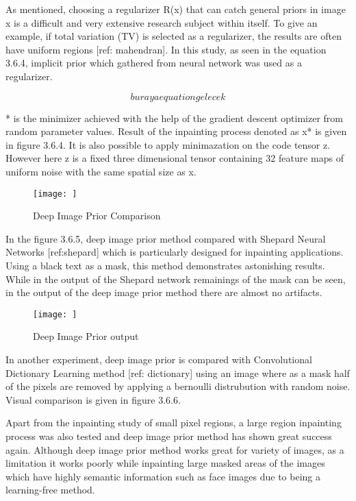 As mentioned, choosing a regularizer R(x) that can catch general priors in image x is a difficult and very extensive research subject within itself. To give an example, if total variation (TV) is selected as a regularizer, the results are often have uniform regions [ref: mahendran]. In this study, as seen in the equation 3.6.4, implicit prior which gathered from neural network was used as a regularizer.

\begin{equation}
    buraya equation gelecek
\end{equation}

* is the minimizer achieved with the help of the gradient descent optimizer from random parameter values. Result of the inpainting process denoted as x* is given in figure 3.6.4. It is also possible to apply minimazation on the code tensor z. However here z is a fixed three dimensional tensor containing 32 feature maps of uniform noise with the same spatial size as x.

\begin{figure}[h]
    \centering
    \texttt{[image: ]}
    \caption{Deep Image Prior Comparison}
    \label{fig:my_label}
\end{figure}

In the figure 3.6.5, deep image prior method compared with Shepard Neural Networks [ref:shepard] which is particularly designed for inpainting applications. Using a black text as a mask, this method demonstrates astonishing results. While in the output of the Shepard network remainings of the mask can be seen, in the output of the deep image prior method there are almost no artifacts.

\begin{figure}[h]
    \centering
    \texttt{[image: ]}
    \caption{Deep Image Prior output}
    \label{fig:my_label}
\end{figure}

In another experiment, deep image prior is compared with Convolutional Dictionary Learning method [ref: dictionary] using an image where as a mask half of the pixels are removed by applying a bernoulli distrubution with random noise. Visual comparison is given in figure 3.6.6.

Apart from the inpainting study of small pixel regions, a large region inpainting process was also tested and deep image prior method has shown great success again. Although deep image prior method works great for variety of images, as a limitation it works poorly while inpainting large masked areas of the images which have highly semantic information such as face images due to being a learning-free method.

